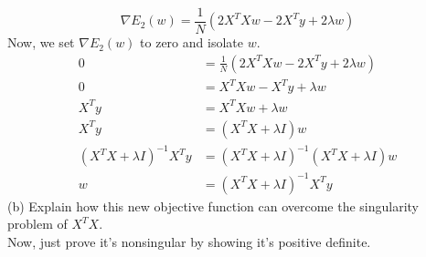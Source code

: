 \documentclass[12pt]{article}
\begin{document}
	\begin{equation*}
	\nabla E_2(w) = \frac{1}{N} (2X^T Xw-2X^T y + 2\lambda w)
	\end{equation*}
	Now, we set $\nabla E_2(w)$ to zero and isolate $w$.
	\begin{align*}
	0 &= \frac{1}{N} (2X^T Xw-2X^T y + 2\lambda w) \\
	0 &= X^T Xw-X^T y + \lambda w \\
	X^T y &= X^T X w + \lambda w	\\
	X^T y &= (X^T X + \lambda I)w \\
	(X^T X + \lambda I)^{-1}X^T y &=(X^T X+\lambda I)^{-1}(X^T X + \lambda I) w \\
	w&=(X^T X + \lambda I)^{-1}X^T y
	\end{align*}
	(b) Explain how this new objective function can overcome the singularity problem
	of $X^T X$. \\
	Now, just prove it's nonsingular by showing it's positive definite. \\
	
	
	
	
	
	
	
	
	
\end{document}
